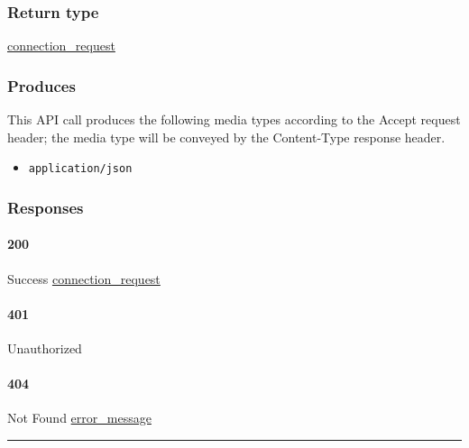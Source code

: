\hypertarget{return-type-1}{%
\subsubsection{Return type}\label{return-type-1}}

\protect\hyperlink{connection_request}{connection\_request}

\hypertarget{produces-3}{%
\subsubsection{Produces}\label{produces-3}}

This API call produces the following media types according to the
{Accept} request header; the media type will be conveyed by the
{Content-Type} response header.

\begin{itemize}
\tightlist
\item
  \texttt{application/json}
\end{itemize}

\hypertarget{responses-3}{%
\subsubsection{Responses}\label{responses-3}}

\hypertarget{section-9}{%
\paragraph{200}\label{section-9}}

Success \protect\hyperlink{connection_request}{connection\_request}

\hypertarget{section-10}{%
\paragraph{401}\label{section-10}}

Unauthorized \protect\hyperlink{}{}

\hypertarget{section-11}{%
\paragraph{404}\label{section-11}}

Not Found \protect\hyperlink{error_message}{error\_message}

\begin{center}\rule{0.5\linewidth}{\linethickness}\end{center}

